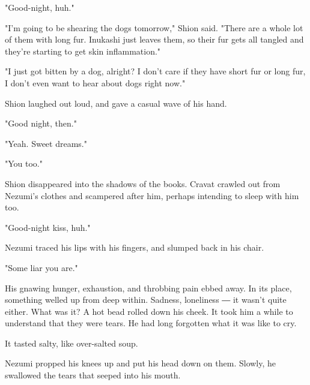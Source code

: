 "Good-night, huh."

"I'm going to be shearing the dogs tomorrow," Shion said. "There are a
whole lot of them with long fur. Inukashi just leaves them, so their fur
gets all tangled and they're starting to get skin inflammation."

"I just got bitten by a dog, alright? I don't care if they have short
fur or long fur, I don't even want to hear about dogs right now."

Shion laughed out loud, and gave a casual wave of his hand.

"Good night, then."

"Yeah. Sweet dreams."

"You too."

Shion disappeared into the shadows of the books. Cravat crawled out from
Nezumi's clothes and scampered after him, perhaps intending to sleep
with him too.

"Good-night kiss, huh."

Nezumi traced his lips with his fingers, and slumped back in his chair.

"Some liar you are."

His gnawing hunger, exhaustion, and throbbing pain ebbed away. In its
place, something welled up from deep within. Sadness, loneliness ― it
wasn't quite either. What was it? A hot bead rolled down his cheek. It
took him a while to understand that they were tears. He had long
forgotten what it was like to cry.

It tasted salty, like over-salted soup.

Nezumi propped his knees up and put his head down on them. Slowly, he
swallowed the tears that seeped into his mouth.